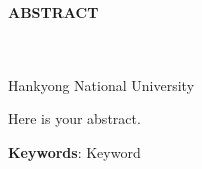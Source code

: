 \begin{center}
  \fontsize{16pt}{0cm}\selectfont
  \textbf{ABSTRACT} \vspace{1.5cm}

  \fontsize{14pt}{0cm}\selectfont
  \textbf{\mytitle} \vspace{1cm}
\end{center}

\begin{flushright}
  \fontsize{12pt}{0.5cm}\selectfont
  \myname\\
  \mydept\\
  Hankyong National University
\end{flushright}
\vspace{1.5cm}
\noindent
Here is your abstract.

\vspace{2cm}
\noindent
\textbf{Keywords}: Keyword
\thispagestyle{empty}
